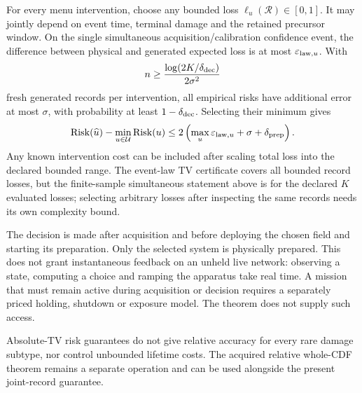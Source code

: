 For every menu intervention, choose any bounded loss
$\ell_u(\mathcal R)\in[0,1]$. It may jointly depend on event time,
terminal damage and the retained precursor window. On the single
simultaneous acquisition/calibration confidence event, the difference
between physical and generated expected loss is at most
$\varepsilon_{{\rm law},u}$. With
\begin{equation}
n\ge\frac{\log(2K/\delta_{\rm dec})}{2\sigma^2}
\label{eq:decisionSamples}
\end{equation}
fresh generated records per intervention, all empirical risks have
additional error at most $\sigma$, with probability at least
$1-\delta_{\rm dec}$. Selecting their minimum gives
\begin{equation}
\operatorname{Risk}(\widehat u)
-\min_{u\in\mathcal U}\operatorname{Risk}(u)
\le2\left(\max_u\varepsilon_{{\rm law},u}+\sigma
+\delta_{\rm prep}\right).
\label{eq:regret}
\end{equation}
Any known intervention cost can be included after scaling total loss
into the declared bounded range. The event-law TV certificate covers
all bounded record losses, but the finite-sample simultaneous statement
above is for the declared $K$ evaluated losses; selecting arbitrary
losses after inspecting the same records needs its own complexity bound.

The decision is made after acquisition and before deploying the chosen
field and starting its preparation. Only the selected system is
physically prepared. This does not grant instantaneous feedback on an
unheld live network: observing a state, computing a choice and ramping
the apparatus take real time. A mission that must remain active during
acquisition or decision requires a separately priced holding, shutdown
or exposure model. The theorem does not supply such access.

Absolute-TV risk guarantees do not give relative accuracy for every
rare damage subtype, nor control unbounded lifetime costs. The acquired
relative whole-CDF theorem remains a separate operation and can be
used alongside the present joint-record guarantee.

